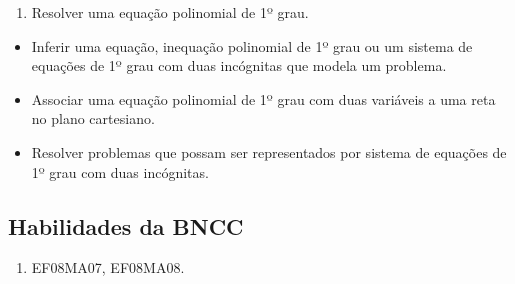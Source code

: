 \begin{enumerate}
\item Resolver uma equação polinomial de 1º grau.
\end{enumerate}

\begin{itemize}
\item
  Inferir uma equação, inequação polinomial de 1º grau ou um sistema de
  equações de 1º grau com duas incógnitas que modela um problema.
\item
  Associar uma equação polinomial de 1º grau com duas variáveis a uma
  reta no plano cartesiano.
\item
  Resolver problemas que possam ser representados por sistema de
  equações de 1º grau com duas incógnitas.
\end{itemize}




\subsection{Habilidades da BNCC} 

\begin{enumerate}
\item EF08MA07, EF08MA08.
\end{enumerate}

